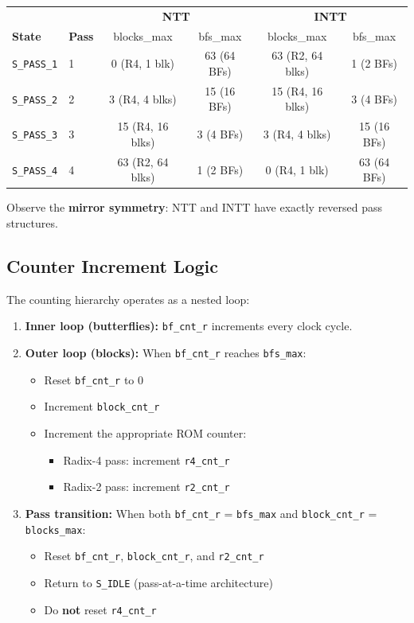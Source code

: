 \documentclass[11pt,a4paper]{article}
\newcommand{\sv}[1]{\texttt{#1}}
\begin{document}
\begin{center}
\renewcommand{\arraystretch}{1.15}
\begin{tabular}{ll|cc|cc}
  \toprule
  & & \multicolumn{2}{c|}{\textbf{NTT}} & \multicolumn{2}{c}{\textbf{INTT}} \\
  \textbf{State} & \textbf{Pass} & blocks\_max & bfs\_max & blocks\_max & bfs\_max \\
  \midrule
  \sv{S\_PASS\_1} & 1 & 0 (R4, 1 blk)   & 63 (64 BFs) & 63 (R2, 64 blks) & 1 (2 BFs) \\
  \sv{S\_PASS\_2} & 2 & 3 (R4, 4 blks)   & 15 (16 BFs) & 15 (R4, 16 blks) & 3 (4 BFs) \\
  \sv{S\_PASS\_3} & 3 & 15 (R4, 16 blks) & 3 (4 BFs)   & 3 (R4, 4 blks)   & 15 (16 BFs) \\
  \sv{S\_PASS\_4} & 4 & 63 (R2, 64 blks) & 1 (2 BFs)   & 0 (R4, 1 blk)    & 63 (64 BFs) \\
  \bottomrule
\end{tabular}
\end{center}

Observe the \textbf{mirror symmetry}: NTT and INTT have exactly reversed pass structures.

\subsection{Counter Increment Logic}

The counting hierarchy operates as a nested loop:

\begin{enumerate}
  \item \textbf{Inner loop (butterflies):} \sv{bf\_cnt\_r} increments every clock cycle.
  \item \textbf{Outer loop (blocks):} When \sv{bf\_cnt\_r} reaches \sv{bfs\_max}:
    \begin{itemize}
      \item Reset \sv{bf\_cnt\_r} to 0
      \item Increment \sv{block\_cnt\_r}
      \item Increment the appropriate ROM counter:
        \begin{itemize}
          \item Radix-4 pass: increment \sv{r4\_cnt\_r}
          \item Radix-2 pass: increment \sv{r2\_cnt\_r}
        \end{itemize}
    \end{itemize}
  \item \textbf{Pass transition:} When both \sv{bf\_cnt\_r} = \sv{bfs\_max} and \sv{block\_cnt\_r} = \sv{blocks\_max}:
    \begin{itemize}
      \item Reset \sv{bf\_cnt\_r}, \sv{block\_cnt\_r}, and \sv{r2\_cnt\_r}
      \item Return to \sv{S\_IDLE} (pass-at-a-time architecture)
      \item Do \textbf{not} reset \sv{r4\_cnt\_r}
    \end{itemize}
\end{enumerate}
\end{document}
